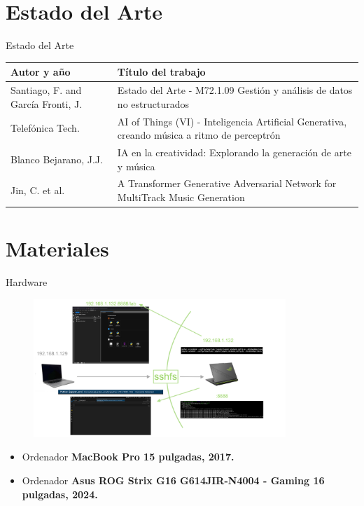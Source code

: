 \documentclass{beamer}
\newcommand{\currentsectionindex}{0}
\begin{document}
\section{Estado del Arte}
\begin{frame}{Estado del Arte}
  \vspace{0.5cm} %
  \hspace{2cm}
  {\fontsize{10pt}{12pt}\selectfont

  \begin{tabular}{|p{4cm}|p{6cm}|}
  \hline
  \textbf{Autor y año} & \textbf{Título del trabajo} \\
  \hline
  Santiago, F. and García Fronti, J. & Estado del Arte - M72.1.09 Gestión y análisis de datos no estructurados \\
  \hline
  Telefónica Tech. & AI of Things (VI) - Inteligencia Artificial Generativa, creando música a ritmo de perceptrón \\
  \hline
  Blanco Bejarano, J.J. & IA en la creatividad: Explorando la generación de arte y música \\
  \hline
  Jin, C. et al. & A Transformer Generative Adversarial Network for MultiTrack Music Generation \\
  \hline
  \end{tabular}

  } %
\end{frame}

\renewcommand{\currentsectionindex}{3}
\section{Materiales}
\begin{frame}{Hardware}
    \begin{figure}[H]
      \centering
      \includegraphics[width=0.85\textwidth]{images/jupyter-diagram.png}
    \end{figure}
    \begin{itemize}
      \item Ordenador \textbf{MacBook Pro 15 pulgadas, 2017.}
      \item Ordenador \textbf{Asus ROG Strix G16 G614JIR-N4004 - Gaming 16 pulgadas, 2024.}
    \end{itemize}

\end{frame}
\end{document}
